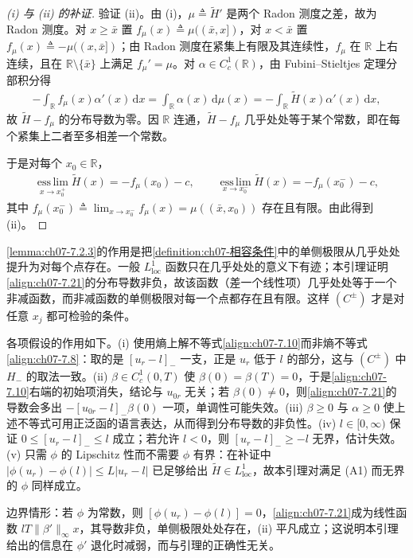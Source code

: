 \documentclass[../../main.tex]{subfiles}%
\begin{document}
\begin{proof}[(i) 与 (ii) 的补证]
验证 (ii)。由 (i)，$\mu\triangleq\widetilde H'$ 是两个 Radon 测度之差，故为 Radon 测度。对 $x\geqslant\bar x$ 置 $f_\mu(x)\triangleq\mu((\bar x,x])$，对 $x<\bar x$ 置 $f_\mu(x)\triangleq-\mu((x,\bar x])$；由 Radon 测度在紧集上有限及其连续性，$f_\mu$ 在 $\mathbb{R}$ 上右连续，且在 $\mathbb{R}\setminus\{\bar x\}$ 上满足 $f_\mu'=\mu$。对 $\alpha\in C^1_c(\mathbb{R})$，由 Fubini--Stieltjes 定理分部积分得
\begin{align*}
-\int_{\mathbb{R}}f_\mu(x)\alpha'(x)\,\mathrm{d}x=\int_{\mathbb{R}}\alpha(x)\,\mathrm{d}\mu(x)
=-\int_{\mathbb{R}}\widetilde H(x)\alpha'(x)\,\mathrm{d}x,
\end{align*}
故 $\widetilde H-f_\mu$ 的分布导数为零。因 $\mathbb{R}$ 连通，$\widetilde H-f_\mu$ 几乎处处等于某个常数，即在每个紧集上二者至多相差一个常数。

于是对每个 $x_0\in\mathbb{R}$，
\begin{align*}
\operatorname*{ess\,lim}_{x\to x_0^+}\widetilde H(x)=-f_\mu(x_0)-c,\qquad
\operatorname*{ess\,lim}_{x\to x_0^-}\widetilde H(x)=-f_\mu(x_0^-)-c,
\end{align*}
其中 $f_\mu(x_0^-)\triangleq\lim_{x\to x_0^-}f_\mu(x)=\mu((\bar x,x_0))$ 存在且有限。由此得到 (ii)。
\end{proof}

\begin{remark}\label{remark:ch07-7.2.3动机}
\cref{lemma:ch07-7.2.3}的作用是把\cref{definition:ch07-相容条件}中的单侧极限从几乎处处提升为对每个点存在。一般 $L^1_{\mathrm{loc}}$ 函数只在几乎处处的意义下有迹；本引理证明\eqref{align:ch07-7.21}的分布导数非负，故该函数（差一个线性项）几乎处处等于一个非减函数，而非减函数的单侧极限对每一个点都存在且有限。这样 $(C^\pm)$ 才是对任意 $x_j$ 都可检验的条件。

各项假设的作用如下。(i) 使用熵上解不等式\eqref{align:ch07-7.10}而非熵不等式\eqref{align:ch07-7.8}：取的是 $[u_r-l]_-$ 一支，正是 $u_r$ 低于 $l$ 的部分，这与 $(C^\pm)$ 中 $H_-$ 的取法一致。(ii) $\beta\in C^1_c(0,T)$ 使 $\beta(0)=\beta(T)=0$，于是\eqref{align:ch07-7.10}右端的初始项消失，结论与 $u_{0r}$ 无关；若 $\beta(0)\neq0$，则\eqref{align:ch07-7.21}的导数会多出 $-[u_{0r}-l]_-\beta(0)$ 一项，单调性可能失效。(iii) $\beta\geqslant0$ 与 $\alpha\geqslant0$ 使上述不等式可用正泛函的语言表达，从而得到分布导数的非负性。(iv) $l\in[0,\infty)$ 保证 $0\leqslant[u_r-l]_-\leqslant l$ 成立；若允许 $l<0$，则 $[u_r-l]_-\geqslant-l$ 无界，估计失效。(v) 只需 $\phi$ 的 Lipschitz 性而不需要 $\phi$ 有界：在补证中 $|\phi(u_r)-\phi(l)|\leqslant L|u_r-l|$ 已足够给出 $\widetilde H\in L^1_{\mathrm{loc}}$，故本引理对满足 (A1) 而无界的 $\phi$ 同样成立。

边界情形：若 $\phi$ 为常数，则 $[\phi(u_r)-\phi(l)]=0$，\eqref{align:ch07-7.21}成为线性函数 $lT\|\beta'\|_\infty x$，其导数非负，单侧极限处处存在，(ii) 平凡成立；这说明本引理给出的信息在 $\phi'$ 退化时减弱，而与引理的正确性无关。
\end{remark}
\end{document}
